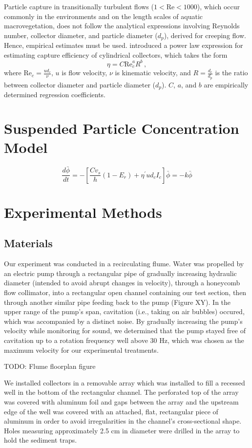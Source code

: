 \documentclass[parskip=full-]{scrreprt}
\newcommand\Rey{\mathrm{Re}}
\begin{document}
Particle capture in transitionally turbulent flows (\(1<\Rey<1000\)), which occur commonly in the environments and on the length scales of aquatic macrovegetation, does not follow the analytical expressions involving Reynolds number, collector diameter, and particle diameter (\(d_p\)), derived for creeping flow. Hence, empirical estimates must be used. \citet{Palmer_2004} introduced a power law expression for estimating capture efficiency of cylindrical collectors, which takes the form \[\eta=C\Rey_c^{a}R^{b}\,,\] where \(\Rey_c=\frac{ud_c}{\nu}\), \(u\) is flow velocity, \(\nu\) is kinematic velocity, and \(R=\frac{d_c}{d_p}\) is the ratio between collector diameter and particle diameter (\(d_p\)). \(C\), \(a\), and \(b\) are empirically determined regression coefficients.

\section{Suspended Particle Concentration Model}

\[\frac{d\bar{\phi}}{dt} = -[\frac{Cv_s}{h}(1-E_r) + \eta^{\prime}ud_cI_c]\bar{\phi} = -k\bar{\phi}\]

\section{Experimental Methods}

\subsection{Materials}

Our experiment was conducted in a recirculating flume. Water was propelled by an electric pump through a rectangular pipe of gradually increasing hydraulic diameter (intended to avoid abrupt changes in velocity), through a honeycomb flow collimator, into a rectangular open channel containing our test section, then through another similar pipe feeding back to the pump (Figure XY). In the upper range of the pump's span, cavitation (i.e., taking on air bubbles) occured, which was accompanied by a distinct noise. By gradually increasing the pump's velocity while monitoring for sound, we determined that the pump stayed free of cavitation up to a rotation frequency well above 30 Hz, which was chosen as the maximum velocity for our experimental treatments. 

TODO: Flume floorplan figure 

We installed collectors in a removable array which was installed to fill a recessed well in the bottom of the rectangular channel. The perforated top of the array was covered with aluminum foil and gaps between the array and the upstream edge of the well was covered with an attached, flat, rectangular piece of aluminum in order to avoid irregularities in the channel's cross-sectional shape. Holes measuring approximately 2.5 cm in diameter were drilled in the array to hold the sediment traps.
\end{document}
